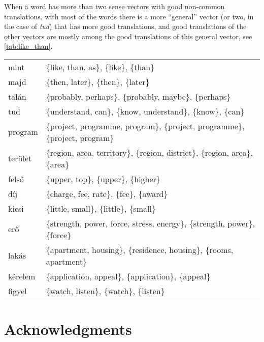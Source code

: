 \documentclass[11pt]{article}
\begin{document}
When a word has more than two sense vectors with good non-common translations,
with most of the words there is a more ``general'' vector (or two, in the case
of \emph{tud}) that has more good translations, and good translations of the
other vectors are mostly among the good translations of this general vector,
see \cref{tab:like_than}.

\begin{table*}[t]
  \begin{tabular}{ll}
    \toprule
    mint	& \{like, than, as\}, \{like\}, \{than\}	\\
    majd	& \{then, later\}, \{then\}, \{later\}	\\
    talán	& \{probably, perhaps\}, \{probably, maybe\}, \{perhaps\}	\\
    tud	& \{understand, can\}, \{know, understand\}, \{know\}, \{can\}	\\
    program	& \{project, programme, program\}, \{project, programme\}, \{project, program\}	\\
    terület	& \{region, area, territory\}, \{region, district\}, \{region, area\}, \{area\}	\\
    felső	& \{upper, top\}, \{upper\}, \{higher\}	\\
    díj	& \{charge, fee, rate\}, \{fee\}, \{award\}	\\
    kicsi	& \{little, small\}, \{little\}, \{small\}	\\
    erő	& \{strength, power, force, stress, energy\}, \{strength, power\}, \{force\}	\\
    lakás	& \{apartment, housing\}, \{residence, housing\}, \{rooms, apartment\}	\\
    kérelem	& \{application, appeal\}, \{application\}, \{appeal\}	\\
    figyel	& \{watch, listen\}, \{watch\}, \{listen\}	\\
    \bottomrule
  \end{tabular}
  \caption{Words with at least three good sense vectors (forward NNs, source is
  the AdaGram model trained on HNC (600 dimensions, $\alpha=.05$)}
  \label{tab:like_than}
\end{table*}

\section{Acknowledgments}
\end{document}
